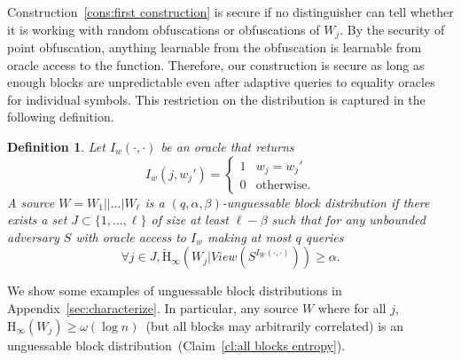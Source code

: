 \documentclass[11pt]{article}
\newcommand{\apref}[1]{\mbox{Appendix~\ref{#1}}}
\newcommand{\clref}[1]{\mbox{Claim~\ref{#1}}}
\newcommand{\consref}[1]{\mbox{Construction~\ref{#1}}}
\newcommand{\Hoo}{\mathrm{H}_\infty}
\newcommand{\Hav}{\tilde{\mathrm{H}}_\infty}
\newtheorem{definition}[theorem]{Definition}
\begin{document}
\consref{cons:first construction} is secure if no distinguisher can tell whether it is working with random obfuscations or obfuscations of $W_j$.  By the security of point obfuscation, anything learnable from the obfuscation is learnable from oracle access to the function. Therefore, our construction is secure as long as enough blocks are unpredictable even after adaptive queries to equality oracles for individual symbols. This restriction on the distribution is captured in the following definition.

\begin{definition}
\label{def:block guessable}
Let $I_w (\cdot, \cdot)$ be an oracle that returns \[I_w(j, w_j')=
\begin{cases}
1 & w_j = w_j'\\
0 & \text{otherwise}.
\end{cases}
\]
A source $W = W_1||...|W_\ell$ is a $(q, \alpha, \beta)$-\emph{unguessable block distribution} if there exists a set $J\subset\{1,..., \ell\}$ of size at least $\ell -\beta$ such that for any unbounded adversary $S$ with oracle access to $I_w$ making at most $q$ queries
\[
\forall j\in J, \Hav(W_j |View(S^{I_{W}(\cdot, \cdot)}))\geq \alpha.
\]
\end{definition}


We show some examples of unguessable block distributions in \apref{sec:characterize}.  In particular, any source $W$ where for all $j$, $\Hoo(W_j) \geq \omega(\log n)$~(but all blocks may arbitrarily correlated) is an unguessable block distribution~(\clref{cl:all blocks entropy}).
\end{document}
